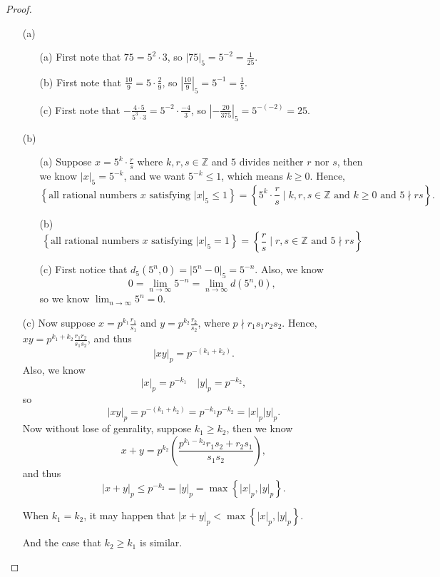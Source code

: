 \begin{proof}
  \vphantom{text}
  \begin{itemize}
    \item [(a)] 
    \vphantom{text}
    \begin{itemize}
      \item [(a)] First note that \(75 = 5^2 \cdot 3\), so \(\vert 75 \vert_5 = 5^{-2} = \frac{1}{25}\).   
      \item [(b)] First note that \(\frac{10}{9} = 5 \cdot \frac{2}{9}\), so \(\left\vert \frac{10}{9} \right\vert _5 = 5^{-1} = \frac{1}{5} \).  
      \item [(c)] First note that \(-\frac{4 \cdot 5}{5^3 \cdot 3} = 5^{-2} \cdot \frac{-4}{3}\), so \(\left\vert - \frac{20}{375} \right\vert _ 5 = 5^{-(-2)} = 25 \).  
    \end{itemize}
    \item [(b)] \vphantom{text}
    \begin{itemize}
      \item [(a)]Suppose \(x = 5^k \cdot \frac{r}{s}\) where \(k,r,s \in \mathbb{Z} \) and \(5\) divides neither \(r\) nor \(s\), then we know \(\vert x \vert_5 = 5^{-k}\), and we want \(5^{-k} \le 1\), which means \(k \ge 0\). Hence,
      \[
        \left\{ \text{all rational numbers } x \text{ satisfying } \vert x \vert_5 \le 1  \right\} = \left\{ 5^k \cdot \frac{r}{s} \mid k,r,s \in \mathbb{Z} \text{ and } k \ge 0 \text{ and } 5 \nmid rs \right\}.  
      \]
      \item [(b)] 
      \[
       \left\{ \text{all rational numbers } x \text{ satisfying } \vert x \vert_5 = 1  \right\} = \left\{\frac{r}{s} \mid r,s \in \mathbb{Z} \text{ and } 5 \nmid rs \right\} 
      \]
      \item [(c)] First notice that \(d_5 \left( 5^n, 0 \right) = \vert 5^n - 0 \vert_5 = 5^{-n}  \). Also, we know 
      \[
        0 = \lim_{n \to \infty} 5^{-n} = \lim_{n \to \infty} d(5^n, 0), 
      \] so we know \(\lim_{n \to \infty} 5^n = 0 \). 
    \end{itemize}
    \item [(c)] Now suppose \(x = p^{k_1} \frac{r_1}{s_1}\) and \(y = p^{k_2} \frac{r_2}{s_2}\), where \(p \nmid r_1 s_1 r_2 s_2\). Hence, \(xy = p^{k_1 + k_2} \frac{r_1 r_2}{s_1 s_2}\), and thus 
    \[
      \vert xy \vert_p = p^{-(k_1 + k_2)}. 
    \]   
    Also, we know 
    \[
      \vert x \vert_p = p^{-k_1} \quad \vert y \vert_p = p^{-k_2}, 
    \]
    so 
    \[
      \vert xy \vert_p = p^{-(k_1 + k_2)} = p^{-k_1}p^{-k_2} = \vert x \vert_p \vert y \vert_p.  
    \]
    Now without lose of genrality, suppose \(k_1 \ge k_2\), then we know 
    \[
      x+y = p^{k_2} \left( \frac{p^{k_1 - k_2}r_1 s_2 + r_2 s_1}{s_1 s_2} \right),
    \] and thus 
    \[
      \vert x+y \vert_p \le p^{-k_2} = \vert y \vert_p = \max \left\{ \vert x \vert_p, \vert y \vert_p   \right\}.   
    \]
    \begin{note}
      When \(k_1 = k_2\), it may happen that \(\vert x+y \vert_p < \max \left\{ \vert x \vert_p , \vert y \vert_p   \right\}  \).
    \end{note}
    And the case that \(k_2 \ge k_1\) is similar. 
  \end{itemize}
\end{proof}

